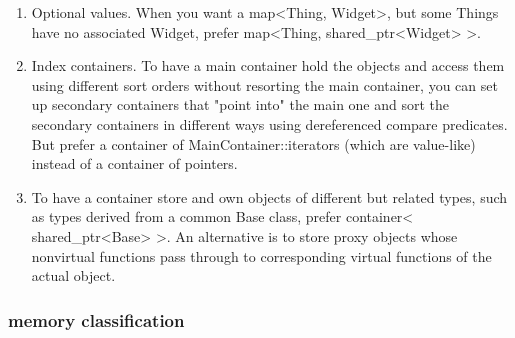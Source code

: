 \documentclass[a4paper,11pt,twoside]{book}
\begin{document}
\begin{itemize}
\begin{enumerate}
\begin{enumerate}
\item Optional values. When you want a map<Thing, Widget>, but some
Things have no associated Widget, prefer map<Thing, shared\_ptr<Widget> >.
\item Index containers. To have a main container hold the objects and access them using different sort orders without resorting the main container, you can set up secondary containers that "point into" the main one and sort the secondary containers in different ways using dereferenced compare predicates. But prefer a container of MainContainer::iterators (which are value-like) instead of a container of pointers.

\item To have a container store and own objects of different but related types, such as types derived from a common Base class, prefer container< shared\_ptr<Base> >. An alternative is to store proxy objects whose nonvirtual functions pass through to corresponding virtual functions of the actual object.
\end{enumerate}

\end{enumerate}

\end{itemize}


\subsubsection{memory classification}
\end{document}

